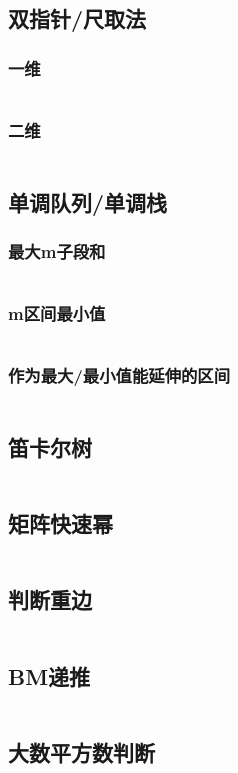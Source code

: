 \documentclass[a4paper,9pt]{article}
\begin{document}
\subsection{双指针/尺取法}
\subsubsection{一维}
\inputminted[]{c++}{Template/Other/TwoPointer.cpp}
\subsubsection{二维}
\inputminted[]{c++}{Template/Other/TwoDimTwoPointer.cpp}
\subsection{单调队列/单调栈}
\subsubsection{最大m子段和}
\inputminted[]{c++}{Template/Other/MonotonicQueueI.cpp}
\subsubsection{m区间最小值}
\inputminted[]{c++}{Template/Other/MonotonicQueueII.cpp}
\subsubsection{作为最大/最小值能延伸的区间}
\inputminted[]{c++}{Template/Other/MonotonicQueueIII.cpp}
\subsection{笛卡尔树}
\inputminted[]{c++}{Template/Other/DescartesTree.cpp}

\subsection{矩阵快速幂}
\inputminted[]{c++}{Template/Other/FastMat.cpp}
\subsection{判断重边}
\inputminted[]{c++}{Template/Other/Edge-Judge-Repeat.cpp}
\subsection{BM递推}
\inputminted[]{c++}{Template/Other/BM.cpp}
\subsection{大数平方数判断}
\inputminted[]{java}{Template/Other/IsSquare.java}
\end{document}
